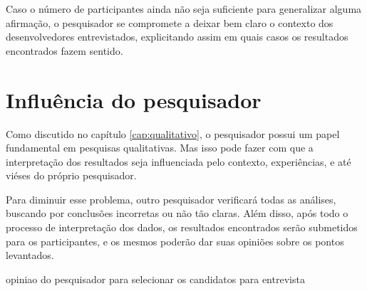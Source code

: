 Caso o número de participantes ainda não seja suficiente para generalizar alguma afirmação, 
o pesquisador se compromete a deixar bem claro o contexto dos desenvolvedores entrevistados,
explicitando assim em quais casos os resultados encontrados fazem sentido.

\section{Influência do pesquisador}

Como discutido no capítulo \ref{cap:qualitativo}, o pesquisador possui
um papel fundamental em pesquisas qualitativas. Mas isso pode fazer com que
a interpretação dos resultados seja influenciada pelo contexto, experiências,
e até viéses do próprio pesquisador.

Para diminuir esse problema, outro pesquisador verificará todas as análises,
buscando por conclusões incorretas ou não tão claras. Além disso, após todo o
processo de interpretação dos dados, os resultados encontrados serão submetidos
para os participantes, e os mesmos poderão dar suas opiniões sobre os pontos
levantados.




opiniao do pesquisador para selecionar os candidatos para entrevista